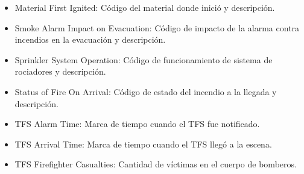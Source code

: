 \documentclass[
  oneside]{memoir}
\begin{document}
\begin{itemize}
\item Material First Ignited: Código del material donde inició y descripción.

\item Smoke Alarm Impact on Evacuation: Código de impacto de la alarma contra incendios en la evacuación y descripción.

\item Sprinkler System Operation: Código de funcionamiento de sistema de rociadores y descripción.

\item Status of Fire On Arrival: Código de estado del incendio a la llegada y descripción.

\item TFS Alarm Time: Marca de tiempo cuando el TFS fue notificado.

\item TFS Arrival Time: Marca de tiempo cuando el TFS llegó a la escena.

\item TFS Firefighter Casualties: Cantidad de víctimas en el cuerpo de bomberos.
\end{itemize}

\printbibliography

\backmatter
\end{document}
